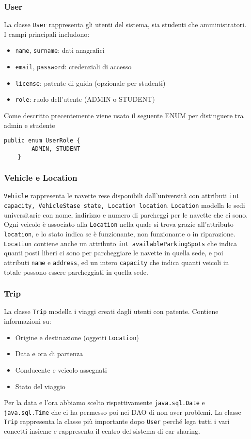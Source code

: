 \subsubsection{User}
La classe \texttt{User} rappresenta gli utenti del sistema, sia studenti che amministratori. I campi principali includono:
\begin{itemize}
\item \texttt{name}, \texttt{surname}: dati anagrafici
\item \texttt{email}, \texttt{password}: credenziali di accesso
\item \texttt{license}: patente di guida (opzionale per studenti)
\item \texttt{role}: ruolo dell'utente (ADMIN o STUDENT)
\end{itemize}
Come descritto precentemente viene usato il seguente ENUM per distinguere tra admin e studente
\begin{lstlisting}[style=java, caption={UserRole ENUM}]
public enum UserRole {
        ADMIN, STUDENT 
    }
\end{lstlisting}

\subsubsection{Vehicle e Location}
\texttt{Vehicle} rappresenta le navette rese disponibili dall'università con attributi \texttt{int capacity, VehicleStase state, Location location}. \texttt{Location} modella le sedi universitarie con nome, indirizzo e numero di parcheggi per le navette che ci sono.
Ogni veicolo è associato alla \texttt{Location} nella quale si trova grazie all'attributo \texttt{location}, e lo stato indica se è funzionante, non funzionante o in riparazione.\\
\texttt{Location} contiene anche un attributo \texttt{int availableParkingSpots} che indica quanti posti liberi ci sono per parcheggiare le navette in quella sede, e poi attributi \texttt{name} e \texttt{address}, ed un intero \texttt{capacity} che indica quanti veicoli in totale possono essere parcheggiati in quella sede.
\subsubsection{Trip}
La classe \texttt{Trip} modella i viaggi creati dagli utenti con patente. Contiene informazioni su:
\begin{itemize}
\item Origine e destinazione (oggetti \texttt{Location})
\item Data e ora di partenza
\item Conducente e veicolo assegnati
\item Stato del viaggio
\end{itemize}
Per la data e l'ora abbiamo scelto rispettivamente \texttt{java.sql.Date} e \texttt{java.sql.Time} che ci ha permesso poi nei DAO di non aver problemi.
La classe \texttt{Trip} rappresenta la classe più importante dopo \texttt{User} perché lega tutti i vari concetti insieme e rappresenta il centro del sistema di car sharing.
